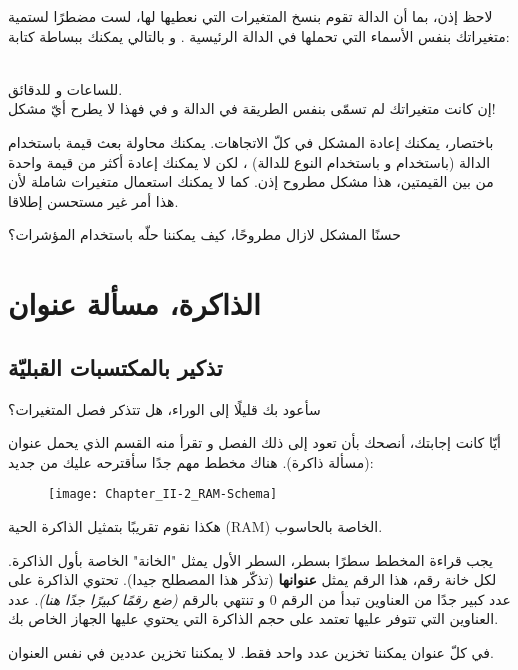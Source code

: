 \begin{information}
	لاحظ إذن، بما أن الدالة تقوم بنسخ المتغيرات التي نعطيها لها، لست مضطرًا لستمية متغيراتك بنفس الأسماء التي تحملها في الدالة الرئيسية
.
و بالتالي يمكنك ببساطة كتابة:

\\
للساعات و
للدقائق.\\
إن كانت متغيراتك لم تسمّى بنفس الطريقة في الدالة و في
فهذا لا يطرح أيّ مشكل!
\end{information}


باختصار، يمكنك إعادة المشكل في كلّ الاتجاهات. يمكنك محاولة بعث قيمة باستخدام الدالة (باستخدام
و باستخدام النوع
للدالة) ، لكن لا يمكنك إعادة أكثر من قيمة واحدة من بين القيمتين، هذا مشكل مطروح إذن. كما لا يمكنك استعمال متغيرات شاملة لأن هذا أمر غير مستحسن إطلاقا.

حسنًا المشكل لازال مطروحًا، كيف يمكننا حلّه باستخدام المؤشرات؟

\section{الذاكرة، مسألة عنوان}

\subsection{تذكير بالمكتسبات القبليّة}

سأعود بك قليلًا إلى الوراء، هل تتذكر فصل المتغيرات؟

أيّا كانت إجابتك، أنصحك بأن تعود إلى ذلك الفصل و تقرأ منه القسم الذي يحمل عنوان (مسألة ذاكرة). هناك مخطط مهم جدًا سأقترحه عليك من جديد:

\begin{figure}[H]
	\centering
	\texttt{[image: Chapter\_II-2\_RAM-Schema]}
\end{figure}


هكذا نقوم تقريبًا بتمثيل الذاكرة الحية
(\textenglish{RAM})
الخاصة بالحاسوب.

يجب قراءة المخطط سطرًا بسطر، السطر الأول يمثل "الخانة" الخاصة بأول الذاكرة. لكل خانة رقم، هذا الرقم يمثل
\textbf{عنوانها}
(تذكّر هذا المصطلح جيدا). تحتوي الذاكرة على عدد كبير جدًا من العناوين تبدأ من الرقم 0 و تنتهي بالرقم
\textit{(ضع رقمًا كبيرًا جدًا هنا)}.
عدد العناوين التي تتوفر عليها تعتمد على حجم الذاكرة التي يحتوي عليها الجهاز الخاص بك.

في كلّ عنوان يمكننا تخزين عدد واحد فقط. لا يمكننا تخزين عددين في نفس العنوان.

